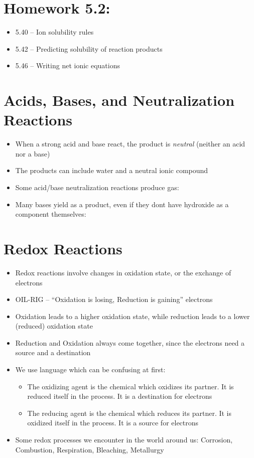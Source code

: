 \documentclass[12pt, openany, letterpaper]{memoir}
\begin{document}
\section*{Homework 5.2:}
\begin{itemize}
  \item 5.40 -- Ion solubility rules
  \item 5.42 -- Predicting solubility of reaction products
  \item 5.46 -- Writing net ionic equations
\end{itemize}

\section{Acids, Bases, and Neutralization Reactions}
\begin{itemize}
	\item When a strong acid and base react, the product is \emph{neutral} (neither an acid nor a base)
	\item The products can include water and a neutral ionic compound
	\item Some acid/base neutralization reactions produce gas: 
	\item Many bases yield  as a product, even if they dont have hydroxide as a component themselves: 
\end{itemize}

\section{Redox Reactions}
\begin{itemize}
	\item Redox reactions involve changes in oxidation state, or the exchange of electrons
	\item OIL-RIG -- ``Oxidation is losing, Reduction is gaining'' electrons
	\item Oxidation leads to a higher oxidation state, while reduction leads to a lower (reduced) oxidation state
	\item Reduction and Oxidation always come together, since the electrons need a source and a destination
	\item We use language which can be confusing at first:
	      \begin{itemize}
		      \item The oxidizing agent is the chemical which oxidizes its partner. It is reduced itself in the process. It is a destination for electrons
		      \item The reducing agent is the chemical which reduces its partner. It is oxidized itself in the process. It is a source for electrons
	      \end{itemize}
	\item Some redox processes we encounter in the world around us: Corrosion, Combustion, Respiration, Bleaching, Metallurgy
\end{itemize}
\end{document}
